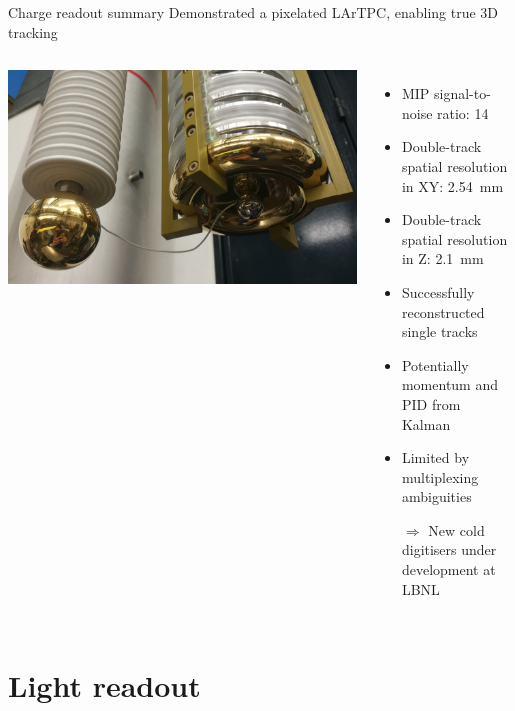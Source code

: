 \documentclass[]{beamer}
\newcommand*{\emphcol}{red}
\newcommand*{\emphcoltitle}{blue}
\newcommand*{\lartpc}{{LArTPC}}
\begin{document}
\begin{frame}{Charge readout summary}{\color{\emphcoltitle} Demonstrated a pixelated \lartpc{}, enabling true 3D tracking}
	\begin{columns}[c]
		\centering
		\includegraphics[width=.8\textheight, angle=90]{defence/viper_cath}
		\begin{itemize}
			\item MIP signal-to-noise ratio: \num{14}
			\item Double-track spatial resolution in XY: \SI{2.54}{\milli\metre}
			\item Double-track spatial resolution in Z: \SI{2.1}{\milli\metre}
			\item Successfully reconstructed single tracks
			\item Potentially momentum and PID from Kalman
			\item {\color{\emphcol} Limited by multiplexing ambiguities}
			\item[$\Rightarrow$] {\color{\emphcol} New cold digitisers under development at LBNL}
		\end{itemize}
	\end{columns}
\end{frame}

\section{Light readout}
\end{document}
